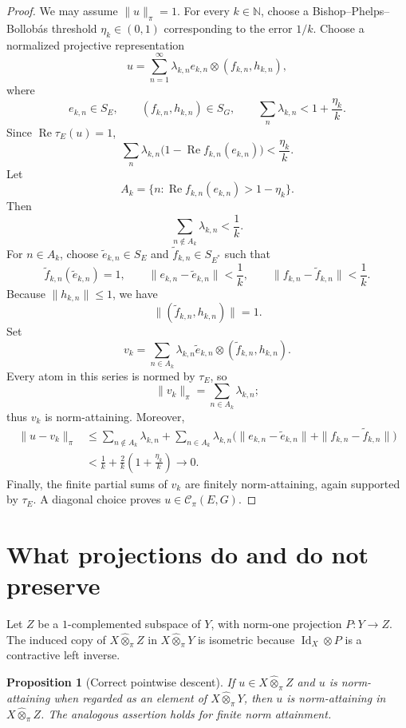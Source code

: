 \documentclass[11pt]{article}
\newtheorem{proposition}[proposition]{Proposition}
\theoremstyle{definition}
\theoremstyle{remark}
\newcommand{\N}{\mathbb N}
\newcommand{\whot}{\widehat\otimes_\pi}
\newcommand{\Rea}{\operatorname{Re}}
\newcommand{\id}{\operatorname{Id}}
\newcommand{\Cpi}{\mathscr C_\pi}
\begin{document}
\begin{proof}
We may assume $\|u\|_\pi=1$.  For every $k\in\N$, choose a Bishop--Phelps--Bollob\'as threshold $\eta_k\in(0,1)$ corresponding to the error $1/k$.  Choose a normalized projective representation
\[
 u=\sum_{n=1}^\infty\lambda_{k,n}e_{k,n}\otimes(f_{k,n},h_{k,n}),
\]
where
\[
 e_{k,n}\in S_E,
 \qquad
 (f_{k,n},h_{k,n})\in S_G,
 \qquad
 \sum_n\lambda_{k,n}<1+\frac{\eta_k}{k}.
\]
Since $\Rea\tau_E(u)=1$,
\[
 \sum_n\lambda_{k,n}
 \bigl(1-\Rea f_{k,n}(e_{k,n})\bigr)
 <\frac{\eta_k}{k}.
\]
Let
\[
 A_k=\{n:\Rea f_{k,n}(e_{k,n})>1-\eta_k\}.
\]
Then
\[
 \sum_{n\notin A_k}\lambda_{k,n}<\frac1k.
\]
For $n\in A_k$, choose $\widetilde e_{k,n}\in S_E$ and $\widetilde f_{k,n}\in S_{E^*}$ such that
\[
 \widetilde f_{k,n}(\widetilde e_{k,n})=1,
 \qquad
 \|e_{k,n}-\widetilde e_{k,n}\|<\frac1k,
 \qquad
 \|f_{k,n}-\widetilde f_{k,n}\|<\frac1k.
\]
Because $\|h_{k,n}\|\leq1$, we have
\[
 \|(\widetilde f_{k,n},h_{k,n})\|=1.
\]
Set
\[
 v_k=\sum_{n\in A_k}\lambda_{k,n}
 \widetilde e_{k,n}\otimes(\widetilde f_{k,n},h_{k,n}).
\]
Every atom in this series is normed by $\tau_E$, so
\[
 \|v_k\|_\pi=\sum_{n\in A_k}\lambda_{k,n};
\]
thus $v_k$ is norm-attaining.  Moreover,
\begin{align*}
 \|u-v_k\|_\pi
 &\leq \sum_{n\notin A_k}\lambda_{k,n}
 +\sum_{n\in A_k}\lambda_{k,n}
 \bigl(\|e_{k,n}-\widetilde e_{k,n}\|
       +\|f_{k,n}-\widetilde f_{k,n}\|\bigr)\\
 &<\frac1k+\frac{2}{k}\left(1+\frac{\eta_k}{k}\right)
 \longrightarrow0.
\end{align*}
Finally, the finite partial sums of $v_k$ are finitely norm-attaining, again supported by $\tau_E$.  A diagonal choice proves $u\in\Cpi(E,G)$.
\end{proof}

\section{What projections do and do not preserve}

Let $Z$ be a $1$-complemented subspace of $Y$, with norm-one projection $P:Y\to Z$.  The induced copy of $X\whot Z$ in $X\whot Y$ is isometric because $\id_X\otimes P$ is a contractive left inverse.

\begin{proposition}[Correct pointwise descent]\label{prop:pointwise}
If $u\in X\whot Z$ and $u$ is norm-attaining when regarded as an element of $X\whot Y$, then $u$ is norm-attaining in $X\whot Z$.  The analogous assertion holds for finite norm attainment.
\end{proposition}
\end{document}

